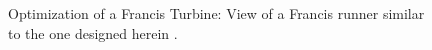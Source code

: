 \begin{figure}[h!]
\begin{minipage}[b]{1\linewidth}
 \centering
\end{minipage}
\caption{Optimization of a Francis Turbine: View of a Francis runner similar to the one designed herein \cite{andritz}. }%
\label{design-parameterization}
\end{figure}


